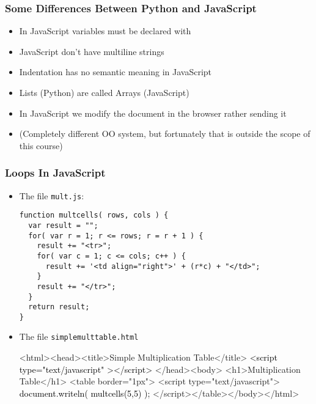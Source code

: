 \documentclass[dvipsnames,handout]{beamer}
\begin{document}
\begin{frame} 
\frametitle{Some Differences Between Python and JavaScript}

\begin{itemize}
\item In JavaScript variables must be declared with
\item JavaScript don't have multiline strings
\item Indentation has no semantic meaning in JavaScript
\item Lists (Python) are called Arrays (JavaScript)
\item In JavaScript we modify the document in the browser rather
  sending it
\item (Completely different OO system, but fortunately that is outside
  the scope of this course)
\end{itemize}  
\end{frame}



\begin{frame}[fragile] 
\frametitle{Loops In JavaScript}
  
\begin{itemize}[<+->]

\item The file \texttt{mult.js}:
  \begin{footnotesize}
\begin{verbatim}
function multcells( rows, cols ) {
  var result = "";
  for( var r = 1; r <= rows; r = r + 1 ) {
    result += "<tr>";
    for( var c = 1; c <= cols; c++ ) {
      result += '<td align="right">' + (r*c) + "</td>";
    }
    result += "</tr>";
  }
  return result; 
}      
\end{verbatim}
  \end{footnotesize}

\item The file \texttt{simplemulttable.html}%
\begin{footnotesize}%
\begin{semiverbatim}
\color{gray}<html><head><title>Simple Multiplication Table</title>
\textcolor{black}{<script type="text/javascript"  ></script>}
</head><body>
  <h1>Multiplication Table</h1>
  <table border="1px">
  <script type="text/javascript">
    \textcolor{black}{document.writeln( multcells(5,5) );}
  </script></table></body></html>
\end{semiverbatim}
\end{footnotesize}
\end{itemize}
\end{frame}
\end{document}
